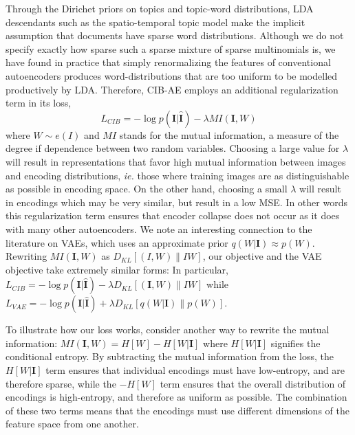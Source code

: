 Through the Dirichet priors on topics and topic-word distributions, LDA descendants such as the spatio-temporal topic model make the implicit assumption that documents have sparse word distributions. Although we do not specify exactly how sparse such a sparse mixture of sparse multinomials is, we have found in practice that simply renormalizing the features of conventional autoencoders produces word-distributions that are too uniform to be modelled productively by LDA. Therefore, CIB-AE employs an additional regularization term in its loss,
\begin{equation}
    L_{CIB} = -\log p(\mathbf{I} | \mathbf{\hat{I}}) - \lambda MI\left(\mathbf{I}, W\right)
\end{equation}
where $W \sim e(I)$ and $MI$ stands for the mutual information, a measure of the degree if dependence between two random variables. Choosing a large value for $\lambda$ will result in representations that favor high mutual information between images and encoding distributions, \emph{ie.} those where training images are as distinguishable as possible in encoding space. On the other hand, choosing a small $\lambda$ will result in encodings which may be very similar, but result in a low MSE. In other words this regularization term ensures that encoder collapse does not occur as it does with many other autoencoders. We note an interesting connection to the literature on VAEs, which uses an approximate prior $q(W|\mathbf{I}) \approx p(W)$. Rewriting $MI\left(\mathbf{I}, W\right)$ as $D_{KL}[(I,W) \| IW ]$, our objective and the VAE objective take extremely similar forms: In particular, $L_{CIB} = -\log p(\mathbf{I} | \mathbf{\hat{I}}) - \lambda D_{KL}[(\mathbf{I},W) \| IW ]$ while $L_{VAE} = -\log p(\mathbf{I} | \mathbf{\hat{I}}) + \lambda D_{KL}[q(W|\mathbf{I}) \| p(W) ]$.

To illustrate how our loss works, consider another way to rewrite the mutual information: $ MI\left(\mathbf{I}, W\right) = H[W] - H[W | \mathbf{I}] $ where $H[W | \mathbf{I}]$ signifies the conditional entropy. By subtracting the mutual information from the loss, the $H[W | \mathbf{I}]$ term ensures that individual encodings must have low-entropy, and are therefore sparse, while the $-H[W]$ term ensures that the overall distribution of encodings is high-entropy, and therefore as uniform as possible. The combination of these two terms means that the encodings must use different dimensions of the feature space from one another.

